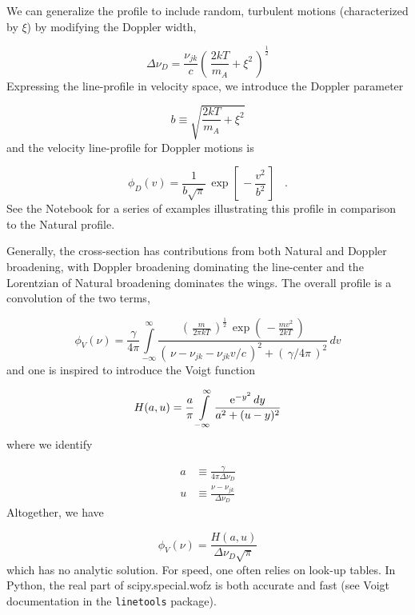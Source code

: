 \documentclass[graybox]{svmult}
\def\ohf{\frac{1}{2}}
\def\ltk{\left [ \,}
\def\ltp{\left ( \,}
\def\rtk{\, \right  ] }
\def\rtp{\, \right  ) }
\def\perd{\;\;\; .}
\def\intl{\int\limits}
\def\rme{{\rm e}}
\begin{document}
We can generalize the profile to include random, turbulent
motions (characterized by $\xi$)
by modifying the Doppler width,

\begin{equation}
\Delta\nu_D = \frac{\nu_{jk}}{c} \ltp \frac{2kT}{m_A} + 
\xi^2 \rtp^\ohf
\end{equation}
Expressing the line-profile in velocity space, we introduce
the Doppler parameter

\begin{equation}
b \equiv \sqrt{\frac{2kT}{m_A} + \xi^2}
\end{equation}
and the velocity line-profile for Doppler motions is

\begin{equation}
\phi_D(v) = \frac{1}{b\sqrt{\pi}} \, \exp \ltk -\frac{v^2}{b^2} \rtk \perd
\label{eqn:phi_Dv}
\end{equation}
See the Notebook for a series of examples illustrating this
profile in comparison to the Natural profile.


Generally, the cross-section has contributions from both
Natural and Doppler broadening,
with Doppler broadening dominating the line-center 
and the Lorentzian of Natural broadening dominates the wings.
The overall profile is a convolution of the two terms,

\begin{equation}
\phi_V(\nu) = \frac{\gamma}{4\pi} \intl_{-\infty}^\infty
\frac{ \ltp \frac{m}{2\pi kT} \rtp^\ohf \, \exp \ltp - \frac{mv^2}{2kT} \rtp}
{\ltp \nu-\nu_{jk}-\nu_{jk}v/c \rtp^2 + \ltp \gamma/4\pi \rtp^2} \, dv
\end{equation}
and one is inspired to introduce the Voigt function

\begin{equation}
H(a,u) = \frac{a}{\pi} \intl_{-\infty}^\infty 
\frac{\rme^{-y^2} \, dy}{a^2 + (u-y)^2}
\end{equation}
where we identify

\begin{align}
a &\equiv \frac{\gamma}{4\pi \Delta\nu_D} \\
u &\equiv \frac{\nu-\nu_{jk}}{\Delta\nu_D}
\end{align}
Altogether, we have 

\begin{equation}
\phi_V(\nu) = \frac{H(a,u)}{\Delta\nu_D \sqrt{\pi}}
\end{equation}
which has no analytic solution.
For speed, one often relies on look-up tables.
In Python, the real part of scipy.special.wofz is both accurate 
and fast (see Voigt documentation in the {\tt linetools} package).
\end{document}
